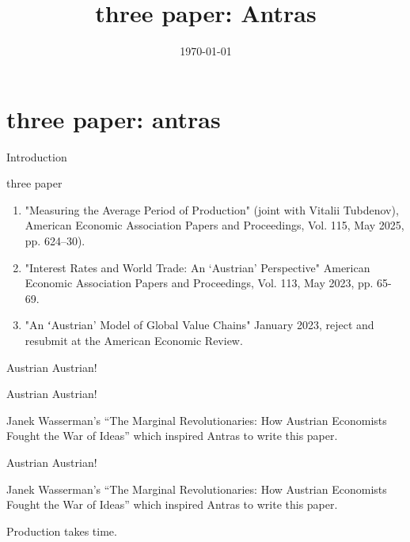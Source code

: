 \documentclass[aspectratio=1610]{beamer}
\title{three paper: Antras}
\date\today
\begin{document}
\begin{frame}[plain]
  \titlepage
\end{frame}



\section{three paper: antras}

\begin{frame}
\centering
 \huge Introduction
\end{frame}

\begin{frame}{three paper}
\begin{enumerate}

    \item "Measuring the Average Period of Production" (joint with Vitalii Tubdenov), American Economic Association Papers and Proceedings, Vol. 115, May 2025, pp. 624–30).\vspace{1cm}
    \item "Interest Rates and World Trade: An ‘Austrian’ Perspective" American Economic Association Papers and Proceedings, Vol. 113, May 2023, pp. 65-69.\vspace{1cm}
    \item "An ʻAustrian’ Model of Global Value Chains" January 2023, reject and resubmit at the American Economic Review.
\end{enumerate}
    
\end{frame}


\begin{frame}{Austrian}
Austrian!


\end{frame}


\begin{frame}{Austrian}
Austrian!

\vspace{1cm}

Janek Wasserman’s “The Marginal Revolutionaries: How Austrian Economists Fought the War of Ideas” which inspired Antras to write this paper.

\end{frame}


\begin{frame}{Austrian}
Austrian!

\vspace{1cm}

Janek Wasserman’s “The Marginal Revolutionaries: How Austrian Economists Fought the War of Ideas” which inspired Antras to write this paper.

\vspace{1cm}

Production takes time.
\end{frame}
\end{document}
